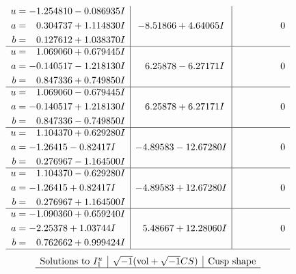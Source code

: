 \documentclass[1p]{elsarticle_modified}
\theoremstyle{definition}
\newcommand{\I}{\sqrt{-1}}
\begin{document}
$$\begin{array}{c|c|c}
\begin{aligned}
u &= -1.254810 - 0.086935 I \\
a &= \phantom{-}0.304737 + 1.114830 I \\
b &= \phantom{-}0.127612 + 1.038370 I\end{aligned}
 & -8.51866 + 4.64065 I & \phantom{-0.000000 } 0 \\ \hline\begin{aligned}
u &= \phantom{-}1.069060 + 0.679445 I \\
a &= -0.140517 - 1.218130 I \\
b &= \phantom{-}0.847336 + 0.749850 I\end{aligned}
 & \phantom{-}6.25878 - 6.27171 I & \phantom{-0.000000 } 0 \\ \hline\begin{aligned}
u &= \phantom{-}1.069060 - 0.679445 I \\
a &= -0.140517 + 1.218130 I \\
b &= \phantom{-}0.847336 - 0.749850 I\end{aligned}
 & \phantom{-}6.25878 + 6.27171 I & \phantom{-0.000000 } 0 \\ \hline\begin{aligned}
u &= \phantom{-}1.104370 + 0.629280 I \\
a &= -1.26415 - 0.82417 I \\
b &= \phantom{-}0.276967 - 1.164500 I\end{aligned}
 & -4.89583 - 12.67280 I & \phantom{-0.000000 } 0 \\ \hline\begin{aligned}
u &= \phantom{-}1.104370 - 0.629280 I \\
a &= -1.26415 + 0.82417 I \\
b &= \phantom{-}0.276967 + 1.164500 I\end{aligned}
 & -4.89583 + 12.67280 I & \phantom{-0.000000 } 0 \\ \hline\begin{aligned}
u &= -1.090360 + 0.659240 I \\
a &= -2.25378 + 1.03744 I \\
b &= \phantom{-}0.762662 + 0.999424 I\end{aligned}
 & \phantom{-}5.48667 + 12.28060 I & \phantom{-0.000000 } 0\\
 \hline 
 \end{array}$$\newpage$$\begin{array}{c|c|c}  
\text{Solutions to }I^u_{1}& \I (\text{vol} + \sqrt{-1}CS) & \text{Cusp shape}\\
 \hline 

\end{array}$$
\end{document}
